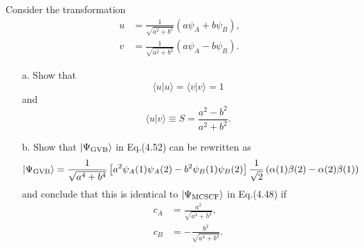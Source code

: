 \documentclass[a4paper]{book}
\begin{document}
	\begin{exercise}
	Consider the transformation
	\begin{align*}
		u &= \frac{1}{\sqrt{ a^2 + b^2 }} \left( a \psi_A + b \psi_B \right), \\
		v &= \frac{1}{\sqrt{ a^2 + b^2 }} \left( a \psi_A - b \psi_B \right).
	\end{align*}
	\begin{enumerate}
	
	\item[a.] Show that
	\[
		\langle u | u \rangle = \langle v | v \rangle = 1
	\]
	and
	\[
		\langle u | v \rangle \equiv S = \frac{ a^2 - b^2 }{ a^2 + b^2 }.
	\]
	
	\item[b.] Show that $|\Psi_{\rm GVB}\rangle$ in Eq.(4.52) can be rewritten as
	\[
		|\Psi_{\rm GVB}\rangle = \frac{1}{\sqrt{ a^4 + b^4 }} \left[ a^2 \psi_A(1) \psi_A(2) - b^2 \psi_B(1) \psi_B(2) \right] \frac{1}{\sqrt{2}} \left( \alpha(1)\beta(2) - \alpha(2)\beta(1) \right)
	\]
	and conclude that this is identical to $|\Psi_{\rm MCSCF}\rangle$ in Eq.(4.48) if
	\begin{align*}
		c_A &= \frac{ a^2 }{ \sqrt{ a^4 + b^4 } }, \\
		c_B &= -\frac{ b^2 }{ \sqrt{ a^4 + b^4 } }.
	\end{align*}
	\end{enumerate}		
	\end{exercise}
	
\end{document}
